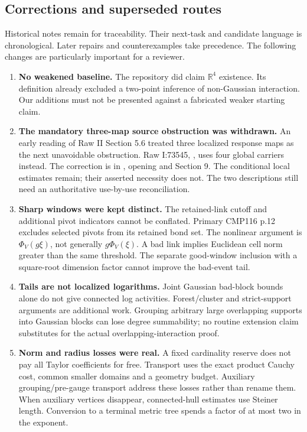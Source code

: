\subsection{Corrections and superseded routes}
\label{hrb-corrections}

Historical notes remain for traceability.
Their next-task and candidate language
is chronological. Later repairs and
counterexamples take precedence.
The following changes are particularly
important for a reviewer.

\begin{enumerate}
\item \textbf{No weakened baseline.}
The repository did claim \(\mathbb R^4\)
existence. Its definition already
excluded a two-point inference of
non-Gaussian interaction. Our additions
must not be presented against a
fabricated weaker starting claim.

\item \textbf{The mandatory three-map
source obstruction was withdrawn.}
An early reading of Raw II Section 5.6
treated three localized response maps
as the next unavoidable obstruction.
Raw I:73545,
,
uses four global carriers instead.
The correction is in
,
opening and Section 9.
The conditional local estimates remain;
their asserted necessity does not.
The two descriptions still need an
authoritative use-by-use reconciliation.

\item \textbf{Sharp windows were kept
distinct.}
The retained-link cutoff and additional
pivot indicators cannot be conflated.
Primary CMP116 p.12 excludes selected
pivots from its retained bond set.
The nonlinear argument is \(\Phi_V(g\xi)\),
not generally \(g\Phi_V(\xi)\).
A bad link implies Euclidean cell norm
greater than the same threshold.
The separate good-window inclusion
with a square-root dimension factor
cannot improve the bad-event tail.

\item \textbf{Tails are not localized
logarithms.}
Joint Gaussian bad-block bounds alone
do not give connected log activities.
Forest/cluster and strict-support
arguments are additional work.
Grouping arbitrary large overlapping
supports into Gaussian blocks can
lose degree summability; no routine
extension claim substitutes for the
actual overlapping-interaction proof.

\item \textbf{Norm and radius losses
were real.}
A fixed cardinality reserve does not
pay all Taylor coefficients for free.
Transport uses the exact product
Cauchy cost, common smaller domains
and a geometry budget. Auxiliary
grouping/pre-gauge transport address
these losses rather than rename them.
When auxiliary vertices disappear,
connected-hull estimates use Steiner
length. Conversion to a terminal
metric tree spends a factor of at
most two in the exponent.


\end{enumerate}
